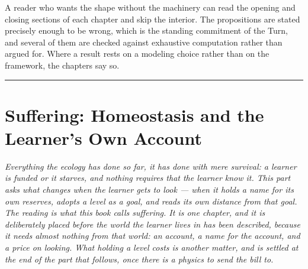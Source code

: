 \documentclass[12pt,openright,twoside]{book}
\theoremstyle{remark}
\theoremstyle{plain}
\theoremstyle{remark}
\theoremstyle{plain}
\theoremstyle{plain}
\begin{document}
A reader who wants the shape without the machinery can read the opening and
closing sections of each chapter and skip the interior.
The propositions are stated precisely enough to be wrong, which is the
standing commitment of the Turn, and several of them are checked against
exhaustive computation rather than argued for.
Where a result rests on a modeling choice rather than on the framework, the
chapters say so.

\bigskip
\noindent\hrule
\bigskip


\part{Suffering: Homeostasis and the Learner's Own Account}
\label{part:choice}

\vspace{1em}
\begin{mdframed}[backgroundcolor=remarkgray, linecolor=gray!60,
                 linewidth=1pt, topline=false, rightline=false,
                 bottomline=false]
\small\itshape
Everything the ecology has done so far, it has done with mere survival: a
learner is funded or it starves, and nothing requires that the learner
know it.
This part asks what changes when the learner gets to look --- when it
holds a name for its own reserves, adopts a level as a goal, and reads
its own distance from that goal.
The reading is what this book calls suffering.
It is one chapter, and it is deliberately placed before the world the
learner lives in has been described, because it needs almost nothing from
that world: an account, a name for the account, and a price on looking.
What holding a level \emph{costs} is another matter, and is settled at the
end of the part that follows, once there is a physics to send the bill
to.
\end{mdframed}

\bigskip

\end{document}
